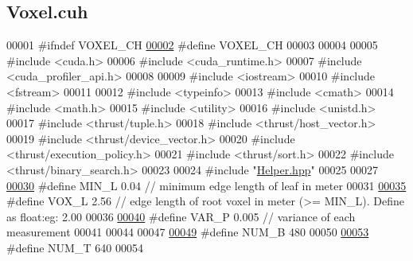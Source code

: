 \hypertarget{Voxel_8cuh_source}{}\subsection{Voxel.\+cuh}
\label{Voxel_8cuh_source}

\begin{DoxyCode}
00001 \textcolor{preprocessor}{#ifndef VOXEL\_CH}
\hypertarget{Voxel_8cuh_source.tex_l00002}{}\hyperlink{Voxel_8cuh_aca76098e63473a0423c740cd04ec72b8}{00002} \textcolor{preprocessor}{#define VOXEL\_CH}
00003 
00004 
00005 \textcolor{preprocessor}{#include <cuda.h>}
00006 \textcolor{preprocessor}{#include <cuda\_runtime.h>}
00007 \textcolor{preprocessor}{#include <cuda\_profiler\_api.h>}
00008 
00009 \textcolor{preprocessor}{#include <iostream>}
00010 \textcolor{preprocessor}{#include <fstream>}
00011 
00012 \textcolor{preprocessor}{#include <typeinfo>}
00013 \textcolor{preprocessor}{#include <cmath>}
00014 \textcolor{preprocessor}{#include <math.h>}
00015 \textcolor{preprocessor}{#include <utility>}
00016 \textcolor{preprocessor}{#include <unistd.h>}
00017 \textcolor{preprocessor}{#include <thrust/tuple.h>}
00018 \textcolor{preprocessor}{#include <thrust/host\_vector.h>}
00019 \textcolor{preprocessor}{#include <thrust/device\_vector.h>}
00020 \textcolor{preprocessor}{#include <thrust/execution\_policy.h>}
00021 \textcolor{preprocessor}{#include <thrust/sort.h>}
00022 \textcolor{preprocessor}{#include <thrust/binary\_search.h>}
00023 
00024 \textcolor{preprocessor}{#include "\hyperlink{Helper_8hpp}{Helper.hpp}"}
00025 
00027 
\hypertarget{Voxel_8cuh_source.tex_l00030}{}\hyperlink{Voxel_8cuh_a29d8f4bb35f9fa62e1d680bc6ab1f4f1}{00030} \textcolor{preprocessor}{#define MIN\_L 0.04 // minimum edge length of leaf in meter}
00031 
\hypertarget{Voxel_8cuh_source.tex_l00035}{}\hyperlink{Voxel_8cuh_a3c1c8b966e30fa8ca2de07abe3b3d74a}{00035} \textcolor{preprocessor}{#define VOX\_L 2.56 // edge length of root voxel in meter (>= MIN\_L). Define as float:eg: 2.00}
00036 
\hypertarget{Voxel_8cuh_source.tex_l00040}{}\hyperlink{Voxel_8cuh_ae1cd6283839fc3aebf9bccbd1044a365}{00040} \textcolor{preprocessor}{#define VAR\_P 0.005 // variance of each measurement}
00041 
00044 
00047 
\hypertarget{Voxel_8cuh_source.tex_l00049}{}\hyperlink{Voxel_8cuh_a9f984157d0b56c37dfb4bd1a16f1e8ab}{00049} \textcolor{preprocessor}{#define NUM\_B 480}
00050 
\hypertarget{Voxel_8cuh_source.tex_l00053}{}\hyperlink{Voxel_8cuh_ad8ba90b2d681fcfbc6cde44271ad6519}{00053} \textcolor{preprocessor}{#define NUM\_T 640}
00054 

\end{DoxyCode}
